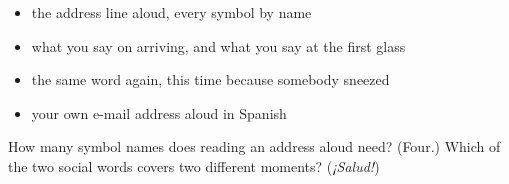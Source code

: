 \begin{itemize}
\raggedright
  \item the address line aloud, every symbol by name
  \item what you say on arriving, and what you say at the first glass
  \item the same word again, this time because somebody sneezed
  \item your own e-mail address aloud in Spanish
\end{itemize}

\begin{tcolorbox}[breakable,colback=teal!4,colframe=teal!35!black,title={Before you move on}]
How many symbol names does reading an address aloud need? (Four.) Which of the two social words covers two different moments? (\emph{¡Salud!})
\end{tcolorbox}
